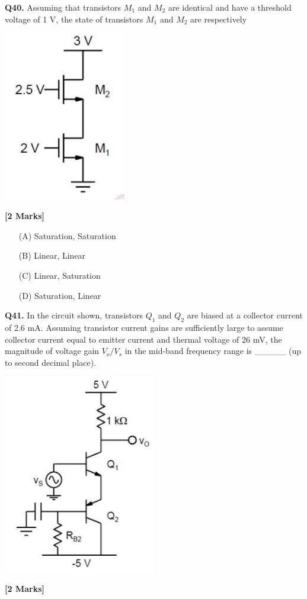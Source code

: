 \documentclass[11pt]{article}
\newcommand{\questionb}[2]{
    \noindent\textbf{Q#2.} #1 \hfill \textbf{[2 Marks]}
}
\begin{document}
\questionb{Assuming that transistors $M_1$ and $M_2$ are identical and have a threshold voltage of 1 V, the state of transistors $M_1$ and $M_2$ are respectively
\begin{center}
\includegraphics[width=0.4\textwidth]{figures/40.png}
\end{center}}{40}
\begin{enumerate}
    \item[(A)] Saturation, Saturation
    \item[(B)] Linear, Linear
    \item[(C)] Linear, Saturation
    \item[(D)] Saturation, Linear
\end{enumerate}

\vspace{0.5cm}

\questionb{In the circuit shown, transistors $Q_1$ and $Q_2$ are biased at a collector current of 2.6 mA. Assuming transistor current gains are sufficiently large to assume collector current equal to emitter current and thermal voltage of 26 mV, the magnitude of voltage gain $V_o/V_s$ in the mid-band frequency range is \_\_\_\_\_ (up to second decimal place).
\begin{center}
\includegraphics[width=0.5\textwidth]{figures/41.png}
\end{center}}{41}
\end{document}
